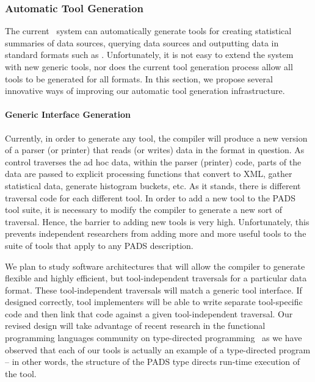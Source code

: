 
\subsubsection{Automatic Tool Generation}

The current \pads{}\ system can automatically generate tools for
creating statistical summaries of data sources, querying
data sources and outputting data in standard formats such as
\xml.  Unfortunately, it is not easy to extend the system with new generic tools,
nor does the current tool generation process allow all tools to be generated for all formats.
In this section, we propose several innovative ways of improving our
automatic tool generation infrastructure.

\paragraph*{Generic Interface Generation}
Currently, in order to generate any tool, the \pads{} compiler will 
produce a new version of a parser (or printer) that reads (or writes)
data in the format in question.  As control traverses the ad hoc data, within the parser (printer) code,
parts of the data are passed to explicit processing functions that 
convert to XML, gather statistical data, generate histogram buckets, etc.
As it stands, there is different traversal code for each different tool.
In order to add a new tool to the PADS tool suite, it is necessary to modify the compiler
to generate a new sort of traversal.  Hence, the barrier to adding new tools
is very high.  Unfortunately, this prevents independent researchers from adding more and more
useful tools to the suite of tools that apply to any PADS description.

We plan to study software architectures that will allow the compiler to generate
flexible and highly efficient, but tool-independent traversals for a particular data format.  
These tool-independent traversals will match a generic tool interface.  If designed correctly, 
tool implementers will be able to write separate tool-specific code and then link that code
against a given tool-independent traversal.  Our revised design will take advantage of
recent research in the functional programming languages community on type-directed 
programming~\cite{crary+:intensional-types,LPJ03,syb2,SYB3}
as we have observed that each of our tools is actually an example 
of a type-directed program -- in other words, the structure of the PADS type directs run-time 
execution of the tool.


